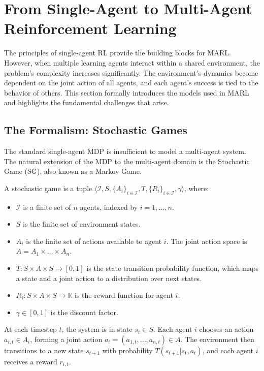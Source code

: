 \section{From Single-Agent to Multi-Agent Reinforcement Learning}
The principles of single-agent RL provide the building blocks for MARL. However, when multiple learning agents interact within a shared environment, the problem's complexity increases significantly. The environment's dynamics become dependent on the joint action of all agents, and each agent's success is tied to the behavior of others. This section formally introduces the models used in MARL and highlights the fundamental challenges that arise.

\subsection{The Formalism: Stochastic Games}
The standard single-agent MDP is insufficient to model a multi-agent system. The natural extension of the MDP to the multi-agent domain is the Stochastic Game (SG), also known as a Markov Game.

\begin{definition}
A stochastic game is a tuple $\langle \mathcal{I}, S, \{A_i\}_{i \in \mathcal{I}}, T, \{R_i\}_{i \in \mathcal{I}}, \gamma \rangle$, where:
\begin{itemize}
    \item $\mathcal{I}$ is a finite set of $n$ agents, indexed by $i=1,...,n$.
    \item $S$ is the finite set of environment states.
    \item $A_i$ is the finite set of actions available to agent $i$. The joint action space is $A = A_1 \times \dots \times A_n$.
    \item $T: S \times A \times S \to [0,1]$ is the state transition probability function, which maps a state and a joint action to a distribution over next states.
    \item $R_i: S \times A \times S \to \mathbb{R}$ is the reward function for agent $i$.
    \item $\gamma \in [0,1]$ is the discount factor.
\end{itemize}
\end{definition}

At each timestep $t$, the system is in state $s_t \in S$. Each agent $i$ chooses an action $a_{i,t} \in A_i$, forming a joint action $a_t = (a_{1,t}, ..., a_{n,t}) \in A$. The environment then transitions to a new state $s_{t+1}$ with probability $T(s_{t+1} | s_t, a_t)$, and each agent $i$ receives a reward $r_{i,t}$.

